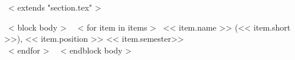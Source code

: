 ~< extends "section.tex" >~

~< block body >~
~< for item in items >~
  << item.name >>
  (<< item.short >>),
  << item.position >>
  \hfill << item.semester>> \\
~< endfor >~
~< endblock body >~
